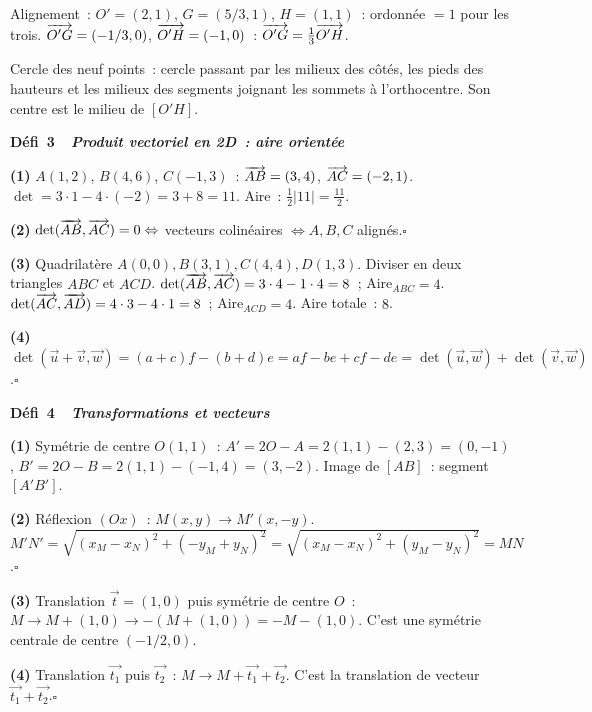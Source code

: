 Alignement~: $O'=(2,1)$, $G=(5/3,1)$, $H=(1,1)$~: ordonnée $=1$ pour les trois.\checkmark
$\overrightarrow{O'G}=(-1/3,0)$, $\overrightarrow{O'H}=(-1,0)$~: $\overrightarrow{O'G}=\frac{1}{3}\overrightarrow{O'H}$.\checkmark

Cercle des neuf points~: cercle passant par les milieux des c\^ot\'es, les pieds des hauteurs et les milieux des segments joignant les sommets \`a l'orthocentre. Son centre est le milieu de $[O'H]$.

\noindent{}
{\color{BO}\bfseries\small D\'efi~3~\textendash\ \textit{Produit vectoriel en 2D~: aire orient\'ee}}
\par\smallskip

\textbf{(1)} $A(1,2)$, $B(4,6)$, $C(-1,3)$~:
$\overrightarrow{AB}=(3,4)$, $\overrightarrow{AC}=(-2,1)$.
$\det=3\cdot1-4\cdot(-2)=3+8=11$.
Aire~: $\frac{1}{2}|11|=\frac{11}{2}$.

\textbf{(2)} $\det(\overrightarrow{AB},\overrightarrow{AC})=0\Leftrightarrow$ vecteurs colin\'eaires $\Leftrightarrow A,B,C$ align\'es.\hfill$\square$

\textbf{(3)} Quadrilat\`ere $A(0,0),B(3,1),C(4,4),D(1,3)$.
Diviser en deux triangles $ABC$ et $ACD$.
$\det(\overrightarrow{AB},\overrightarrow{AC})=3\cdot4-1\cdot4=8$~; Aire$_{ABC}=4$.
$\det(\overrightarrow{AC},\overrightarrow{AD})=4\cdot3-4\cdot1=8$~; Aire$_{ACD}=4$.
Aire totale~: $8$.

\textbf{(4)} $\det(\vec{u}+\vec{v},\vec{w})=(a+c)f-(b+d)e=af-be+cf-de
=\det(\vec{u},\vec{w})+\det(\vec{v},\vec{w})$.\hfill$\square$

\noindent{}
{\color{BO}\bfseries\small D\'efi~4~\textendash\ \textit{Transformations et vecteurs}}
\par\smallskip

\textbf{(1)} Sym\'etrie de centre $O(1,1)$~: $A'=2O-A=2(1,1)-(2,3)=(0,-1)$,
$B'=2O-B=2(1,1)-(-1,4)=(3,-2)$.
Image de $[AB]$~: segment $[A'B']$.

\textbf{(2)} R\'eflexion $(Ox)$~: $M(x,y)\to M'(x,-y)$.
$M'N'=\sqrt{(x_M-x_N)^2+(-y_M+y_N)^2}=\sqrt{(x_M-x_N)^2+(y_M-y_N)^2}=MN$.\hfill$\square$

\textbf{(3)} Translation $\vec{t}=(1,0)$ puis sym\'etrie de centre $O$~:
$M\to M+(1,0)\to-(M+(1,0))=-M-(1,0)$.
C'est une sym\'etrie centrale de centre $(-1/2,0)$.

\textbf{(4)} Translation $\vec{t_1}$ puis $\vec{t_2}$~: $M\to M+\vec{t_1}+\vec{t_2}$.
C'est la translation de vecteur $\vec{t_1}+\vec{t_2}$.\hfill$\square$

